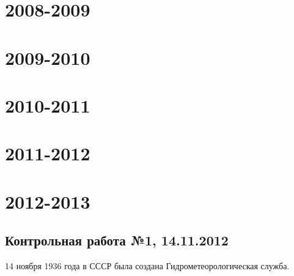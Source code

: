 \documentclass[12pt, a4paper]{article}\usepackage[]{graphicx}\usepackage[]{color}
\begin{document}


\section{2008-2009}



\section{2009-2010}



\section{2010-2011}



\section{2011-2012}



\section{2012-2013}

\subsection{Контрольная работа №1, 14.11.2012}




\vspace{20pt}
14 ноября 1936 года в СССР была создана Гидрометеорологическая служба.
\vspace{20pt}
\end{document}
